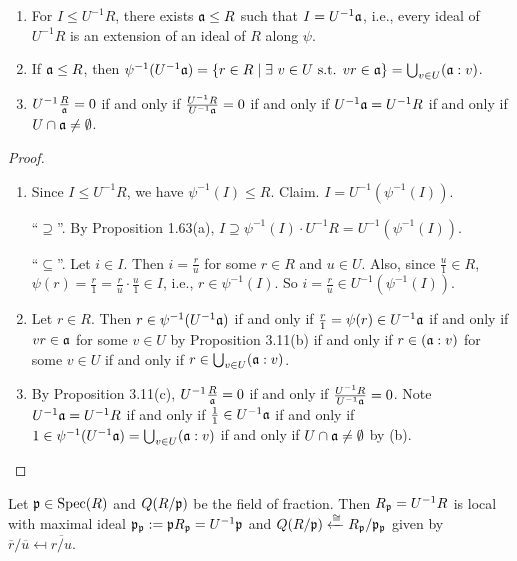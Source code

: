 \begin{proposition}
    \begin{enumerate}
        \item For $I \leq U^{-1}R$, there exists $\mathfrak{a} \leq R$ such that $I = U^{-1}\mathfrak{a}$, i.e., every ideal of $U^{-1}R$ is an extension of an ideal of $R$ along $\psi$.
        \item If $\mathfrak{a} \leq R$, then $\psi^{-1}(U^{-1}\mathfrak{a}) =\{r \in R \mid \exists \  v \in U \text{ s.t. }v r \in \mathfrak{a}\} = \bigcup_{v \in U} (\mathfrak{a}:v)$.
        \item $U^{-1} \frac{R}{\mathfrak{a}} = 0$ if and only if $\frac{U^{-1}R}{U^{-1}\mathfrak{a}} = 0$ if and only if $U^{-1}\mathfrak{a} = U^{-1}R$ if and only if $U \cap \mathfrak{a} \neq \emptyset$.
    \end{enumerate}
\end{proposition}

\begin{proof}
    \begin{enumerate}
        \item Since $I \leq U^{-1}R$, we have $\psi^{-1}(I) \leq R$. Claim. $I = U^{-1} (\psi^{-1}(I))$. \par 
            ``$\supseteq$''. By Proposition 1.63(a), $I \supseteq \psi^{-1}(I) \cdot U^{-1}R  = U^{-1} (\psi^{-1}(I))$. \par  
            ``$\subseteq$''. Let $i \in I$. Then $i = \frac{r}{u}$ for some $r \in R$ and $u \in U$. Also, since $\frac{u}{1} \in R$, $\psi(r) = \frac{r}{1} = \frac{r}{u} \cdot \frac{u}{1} \in I$, i.e., $r \in \psi^{-1}(I)$. So $i = \frac{r}{u} \in U^{-1} (\psi^{-1}(I))$.
        \item  
            Let $r \in R$. Then $r \in \psi^{-1}(U^{-1}\mathfrak{a})$ if and only if $\frac{r}{1} = \psi(r) \in U^{-1}\mathfrak{a}$ if and only if $vr \in \mathfrak{a}$ for some $v \in U$ by Proposition 3.11(b) if and only if $r \in (\mathfrak{a}:v)$ for some $v \in U$ if and only if $r \in \bigcup_{v \in U}(\mathfrak{a}:v)$. 
        \item
            By Proposition 3.11(c), $U^{-1} \frac{R}{\mathfrak{a}} = 0$ if and only if $\frac{U^{-1}R}{U^{-1}\mathfrak{a}} = 0$. Note $U^{-1}\mathfrak{a} = U^{-1}R$ if and only if $\frac{1}{1} \in U^{-1}\mathfrak{a}$ if and only if $1 \in \psi^{-1}(U^{-1}\mathfrak{a}) = \bigcup_{v \in U}(\mathfrak{a}:v)$ if and only if $U \cap \mathfrak{a} \neq \emptyset$ by (b). \qedhere
    \end{enumerate}
\end{proof}

\begin{corollary}
    Let $\mathfrak{p} \in \operatorname{Spec}(R)$ and $Q(R/\mathfrak{p})$ be the field of fraction. Then $R_{\mathfrak{p}} = U^{-1}R$ is local with maximal ideal $\mathfrak{p}_{\mathfrak{p}} := \mathfrak{p} R_{\mathfrak{p}} = U^{-1}\mathfrak{p}$ and $Q(R/\mathfrak{p}) \xleftarrow \cong R_{\mathfrak{p}}/\mathfrak{p}_{\mathfrak{p}}$ given by $\overbar r / \overbar u \mapsfrom \overbar {r/u}$.
\end{corollary}

